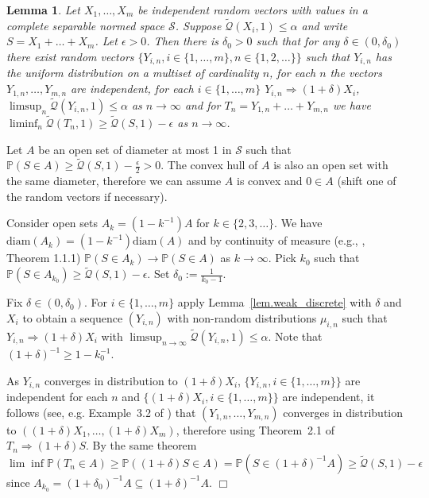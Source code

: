 \documentclass{article}
\newenvironment{proof}{\noindent{\bf Proof}}{\hspace*{\fill}$\Box$}
\newtheorem{lemma} [theorem] {Lemma}\newtheorem{attempt} [theorem] {Attempt}\newtheorem{corollary} [theorem] {Corollary}\newtheorem{prop} [theorem] {Proposition}\newtheorem{definition} [theorem] {Definition}\newtheorem{remark} [theorem] {Remark}\newtheorem{conjecture} [theorem] {Conjecture}\newtheorem{claim} [theorem] {Claim}
\newcommand{\pr}{\mathbb P}
\newcommand{\concdiam}{\tilde{\mathcal{Q}}}
\newcommand{\diam}{\mathrm{diam}}
\begin{document}
\begin{lemma}\label{lem.discrete_approx_try}
    Let $X_1, \dots, X_m$ be independent random vectors with values in a complete separable normed space $\mathcal{S}$. Suppose 
    $\concdiam(X_i,1) \le \alpha$ and write $S = X_1 + \dots + X_m$. 
    Let $\epsilon > 0$. Then there is $\delta_0 > 0$
    such that for any $\delta \in (0, \delta_0)$ 
    there exist random vectors $\{Y_{i,n}, i \in \{1,\dots, m\}, n \in \{1, 2, \dots\}\}$ such that $Y_{i,n}$ has the uniform distribution on a multiset of cardinality $n$,
    for each $n$ the vectors $Y_{1,n}, \dots, Y_{m,n}$ are independent,
    for each $i \in \{1,\dots,m\}$
    $Y_{i,n} \Rightarrow (1+\delta) X_i$, $\limsup_n \concdiam(Y_{i,n},1) \le \alpha$ as $n\to \infty$
    and for $T_n = Y_{1,n} + \dots + Y_{m,n}$ we have
    $\liminf_n \concdiam(T_n,1) \ge \concdiam(S,1) - \epsilon$
    as $n \to \infty$.
\end{lemma}


\begin{proof}
     Let $A$ be an open set of diameter at most
     1 in $\mathcal{S}$ such that $\pr(S \in A) \ge \concdiam(S, 1) - \frac{\epsilon} 2 > 0$.
The convex hull of $A$ is also an open set with the same diameter,
therefore we can assume $A$ is convex and
     $0 \in A$ (shift one of the random vectors if necessary).


Consider open sets $A_k = (1 - k^{-1}) A$ for $k \in \{2, 3, \dots\}$. We have $\diam (A_k) = (1-k^{-1}) \diam(A)$
     and by continuity of measure (e.g., \cite{durrett}, Theorem 1.1.1) $\pr(S \in A_k) \to \pr(S \in A)$ as $k \to \infty$.
     Pick $k_0$ such that $\pr(S \in A_{k_0}) \ge \concdiam(S,1) - \epsilon$. Set $\delta_0 := \frac 1 {k_0-1}$.

     Fix $\delta \in (0, \delta_0)$.
     For $i \in \{1, \dots, m\}$
     apply Lemma~\ref{lem.weak_discrete} with $\delta$ and $X_i$
     to obtain a sequence $(Y_{i,n})$ with non-random distributions $\mu_{i,n}$ such that $Y_{i,n} \Rightarrow (1+\delta) X_i$ with $\limsup_{n\to\infty}\concdiam(Y_{i,n},1) \le \alpha$.
     Note that $(1+\delta)^{-1} \ge 1-k_0^{-1}$.

As $Y_{i,n}$ converges in distribution to $(1+\delta) X_i$, $\{Y_{i,n}, i \in \{1, \dots, m\}\}$ are independent for each $n$
     and $\{(1+\delta) X_i, i \in \{1,\dots,m\}\}$ are independent, it follows (see, e.g. Example~3.2 of \cite{billingsley_1999}) that $(Y_{1,n}, \dots, Y_{m,n})$ converges in distribution to $((1+\delta) X_1, \dots, (1+\delta)X_m)$, therefore using Theorem~2.1 of \cite{billingsley_1999} $T_n \Rightarrow (1 + \delta)S$.
By the same theorem
     $\lim \inf \pr(T_n \in A) \ge \pr((1+\delta) S \in A) = \pr(S \in (1+\delta)^{-1} A) \ge \concdiam(S,1) - \epsilon$ since  $A_{k_0} = (1+\delta_0)^{-1} A \subseteq  (1+\delta)^{-1} A$.
\end{proof}
\end{document}
